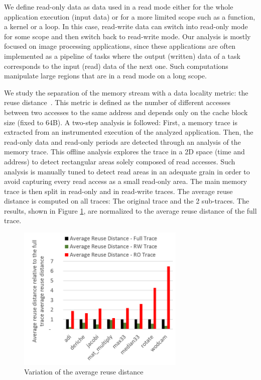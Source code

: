 \documentclass[sigconf]{acmart}
\begin{document}
We define read-only data as data used in a read mode either for the
whole application execution (input data) or for a more limited scope
such as a function, a kernel or a loop. In this case, read-write data
can switch into read-only mode for some scope and then switch back to
read-write mode. Our analysis is mostly focused on image processing
applications, since these applications are often implemented as
a pipeline of tasks where the output (written) data of a task
corresponds to the input (read) data of the next one. Such computations
manipulate large regions that are in a read mode on a long scope.

We study the separation of the memory stream with a data locality metric: the reuse distance~\cite{Coffman:1973}. This metric is defined as the number of different accesses between two accesses to the same address and depends only on the cache block size (fixed to 64B). A two-step analysis is followed: First, a memory trace is extracted from an instrumented execution of the analyzed application. Then, the read-only data and read-only periods are detected through an analysis of the memory trace. This offline analysis explores the trace in a 2D space (time and address) to detect rectangular areas solely composed of read accesses. Such analysis is manually tuned to detect read areas in an adequate grain in order to avoid capturing every read access as a small read-only area. The main memory trace is then split in read-only and in read-write traces. The average reuse distance is computed on all traces: The original trace and the 2 sub-traces. The results, shown in Figure \ref{stackdistance}, are normalized to the average reuse distance of the full trace.


\begin{figure}
    \centering
    \includegraphics[width=8cm]{./images/stackdistance.png}
     \caption{Variation of the average reuse distance}
    \label{stackdistance}
\end{figure}
\end{document}
